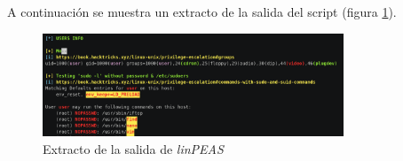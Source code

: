 A continuación se muestra un extracto de la salida del script (figura \ref{fig:linpeas-out}).

\begin{figure}[h]
    \centering
    \includegraphics[width=0.8\textwidth]{images/sections/tools/linpeas-out.png}
    \caption{Extracto de la salida de \textit{linPEAS}}
    \label{fig:linpeas-out}
\end{figure}